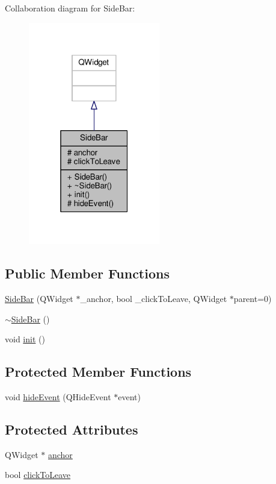 Collaboration diagram for Side\+Bar\+:
\nopagebreak
\begin{figure}[H]
\begin{center}
\leavevmode
\includegraphics[width=163pt]{classSideBar__coll__graph}
\end{center}
\end{figure}
\subsection*{Public Member Functions}
\begin{DoxyCompactItemize}
\item 
\hyperlink{classSideBar_a9a331f6c3df3538c9cb8f5cb55f70aa6}{Side\+Bar} (Q\+Widget $\ast$\+\_\+anchor, bool \+\_\+click\+To\+Leave, Q\+Widget $\ast$parent=0)
\item 
\hyperlink{classSideBar_ab6585fb18d33836f7210a804eb9fcfa0}{$\sim$\+Side\+Bar} ()
\item 
void \hyperlink{classSideBar_af019dc58f6715e159a625a6628c2b126}{init} ()
\end{DoxyCompactItemize}
\subsection*{Protected Member Functions}
\begin{DoxyCompactItemize}
\item 
void \hyperlink{classSideBar_ac03ec8432ae5bc1849cbeade35f9458c}{hide\+Event} (Q\+Hide\+Event $\ast$event)
\end{DoxyCompactItemize}
\subsection*{Protected Attributes}
\begin{DoxyCompactItemize}
\item 
Q\+Widget $\ast$ \hyperlink{classSideBar_a0a6a0df257a08bdf785aeb155870efbc}{anchor}
\item 
bool \hyperlink{classSideBar_a8d0dba44a11de50893409620294498fb}{click\+To\+Leave}
\end{DoxyCompactItemize}


